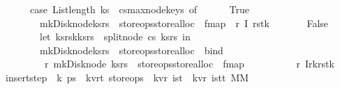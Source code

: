 \begin{isabellebody}
\ \ \ \ \ \ case\ {\isacharparenleft}List{\isachardot}length\ ks{\isacharprime}\ {\isasymle}\ cs{\isacharbar}{\isachargreater}max{\isacharunderscore}node{\isacharunderscore}keys{\isacharparenright}\ of\isanewline
\ \ \ \ \ \ True\ {\isasymRightarrow}\ {\isacharparenleft}\isanewline
\ \ \ \ \ \ \ \ mk{\isacharunderscore}Disk{\isacharunderscore}node{\isacharparenleft}ks{\isacharprime}{\isacharcomma}rs{\isacharprime}{\isacharparenright}\ {\isacharbar}{\isachargreater}\ {\isacharparenleft}store{\isacharunderscore}ops{\isacharbar}{\isachargreater}store{\isacharunderscore}alloc{\isacharparenright}\ {\isacharbar}{\isachargreater}\ fmap\ {\isacharparenleft}{\isacharpercent}\ r{\isachardot}\ {\isacharparenleft}I{}\ r{\isacharcomma}stk{\isacharprime}{\isacharparenright}{\isacharparenright}{\isacharparenright}\isanewline
\ \ \ \ \ \ {\isacharbar}\ False\ {\isasymRightarrow}\ {\isacharparenleft}\isanewline
\ \ \ \ \ \ \ \ let\ {\isacharparenleft}ks{\isacharunderscore}rs{}{\isacharcomma}k{\isacharcomma}ks{\isacharunderscore}rs{}{\isacharparenright}\ {\isacharequal}\ split{\isacharunderscore}node\ cs\ {\isacharparenleft}ks{\isacharprime}{\isacharcomma}rs{\isacharprime}{\isacharparenright}\ in\ \ \isanewline
\ \ \ \ \ \ \ \ mk{\isacharunderscore}Disk{\isacharunderscore}node{\isacharparenleft}ks{\isacharunderscore}rs{}{\isacharparenright}\ {\isacharbar}{\isachargreater}\ {\isacharparenleft}store{\isacharunderscore}ops{\isacharbar}{\isachargreater}store{\isacharunderscore}alloc{\isacharparenright}\ {\isacharbar}{\isachargreater}\ bind\isanewline
\ \ \ \ \ \ \ \ {\isacharparenleft}{\isacharpercent}\ r{}{\isachardot}\ mk{\isacharunderscore}Disk{\isacharunderscore}node\ {\isacharparenleft}ks{\isacharunderscore}rs{}{\isacharparenright}\ {\isacharbar}{\isachargreater}\ {\isacharparenleft}store{\isacharunderscore}ops{\isacharbar}{\isachargreater}store{\isacharunderscore}alloc{\isacharparenright}\ {\isacharbar}{\isachargreater}\ fmap\ \isanewline
\ \ \ \ \ \ \ \ {\isacharparenleft}{\isacharpercent}\ r{}{\isachardot}\ {\isacharparenleft}I{}{\isacharparenleft}r{}{\isacharcomma}k{\isacharcomma}r{}{\isacharparenright}{\isacharcomma}stk{\isacharprime}{\isacharparenright}{\isacharparenright}{\isacharparenright}{\isacharparenright}\ {\isacharparenright}{\isacharparenright}{\isacharparenright}{\isachardoublequoteclose}\isanewline
\isanewline
\isanewline
{}\isamarkupfalse%
\ insert{\isacharunderscore}step\ {\isacharcolon}{\isacharcolon}\ {\isachardoublequoteopen}{\isacharprime}k\ ps{}\ {\isasymRightarrow}\ {\isacharparenleft}{\isacharprime}k{\isacharcomma}{\isacharprime}v{\isacharcomma}{\isacharprime}r{\isacharcomma}{\isacharprime}t{\isacharparenright}\ store{\isacharunderscore}ops\ {\isasymRightarrow}\ {\isacharparenleft}{\isacharprime}k{\isacharcomma}{\isacharprime}v{\isacharcomma}{\isacharprime}r{\isacharparenright}\ ist\ {\isasymRightarrow}\ {\isacharparenleft}{\isacharparenleft}{\isacharprime}k{\isacharcomma}{\isacharprime}v{\isacharcomma}{\isacharprime}r{\isacharparenright}\ ist{\isacharcomma}{\isacharprime}t{\isacharparenright}\ MM{\isachardoublequoteclose}\ \isanewline

\end{isabellebody}
